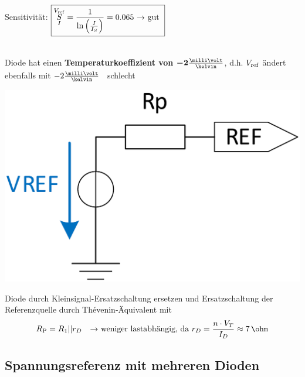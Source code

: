 \hfill
\begin{minipage}[c]{0.78\columnwidth}

    
    Sensitivität:
    $ \boxed{ \overunderset{V_{\rm ref}}{I}{S} = \frac{1}{\ln \Big( \frac{I}{I_S} \Big)} = 0.065 \text{ \textrightarrow\ gut }} $

    \vspace{0.2cm}
     \\
    Diode hat einen \textbf{Temperaturkoeffizient von} $\boldsymbol{-2 \frac{\milli \volt}{\kelvin}}$, d.h. $V_{\rm ref}$ ändert ebenfalls
    mit ${-2 \frac{\milli \volt}{\kelvin}}$ \textrightarrow\ schlecht
\end{minipage}


\begin{minipage}[c]{0.2\columnwidth}
    \includegraphics[width=\columnwidth]{images/thevenin.png}
\end{minipage}
\hfill
\begin{minipage}[c]{0.78\columnwidth}
    Diode durch Kleinsignal-Ersatzschaltung ersetzen und Ersatzschaltung der Referenzquelle durch Thévenin-Äquivalent mit
    $$ R_{\rm P} = R_1 || r_D \quad \text{\textrightarrow\ weniger lastabhängig, da } r_D = \frac{n \cdot V_T}{I_D} \approx 7 \, \ohm $$
\end{minipage}


\subsection{Spannungsreferenz mit mehreren Dioden}


